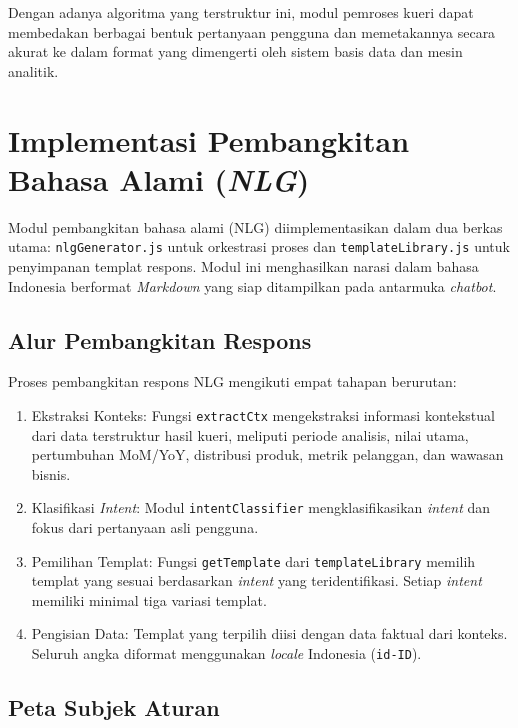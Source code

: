 Dengan adanya algoritma yang terstruktur ini, modul pemroses kueri dapat membedakan berbagai bentuk pertanyaan pengguna dan memetakannya secara akurat ke dalam format yang dimengerti oleh sistem basis data dan mesin analitik.

\section{Implementasi Pembangkitan Bahasa Alami (\textit{NLG})}
\label{sec:impl-nlg}

Modul pembangkitan bahasa alami (NLG) diimplementasikan dalam dua berkas utama: \texttt{nlgGenerator.js} untuk orkestrasi proses dan \texttt{templateLibrary.js} untuk penyimpanan templat respons. Modul ini menghasilkan narasi dalam bahasa Indonesia berformat \textit{Markdown} yang siap ditampilkan pada antarmuka \textit{chatbot}.

\subsection{Alur Pembangkitan Respons}

Proses pembangkitan respons NLG mengikuti empat tahapan berurutan:

\begin{enumerate}
    \item Ekstraksi Konteks: Fungsi \texttt{extractCtx} mengekstraksi informasi kontekstual dari data terstruktur hasil kueri, meliputi periode analisis, nilai utama, pertumbuhan MoM/YoY, distribusi produk, metrik pelanggan, dan wawasan bisnis.
    \item Klasifikasi \textit{Intent}: Modul \texttt{intentClassifier} mengklasifikasikan \textit{intent} dan fokus dari pertanyaan asli pengguna.
    \item Pemilihan Templat: Fungsi \texttt{getTemplate} dari \texttt{templateLibrary} memilih templat yang sesuai berdasarkan \textit{intent} yang teridentifikasi. Setiap \textit{intent} memiliki minimal tiga variasi templat.
    \item Pengisian Data: Templat yang terpilih diisi dengan data faktual dari konteks. Seluruh angka diformat menggunakan \textit{locale} Indonesia (\texttt{id-ID}).
\end{enumerate}

\subsection{Peta Subjek Aturan}

